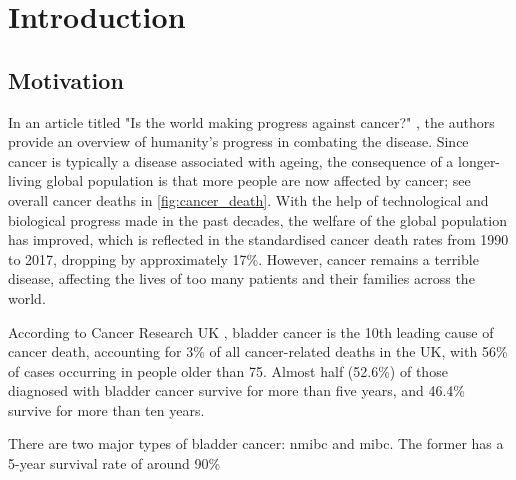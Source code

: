 
\chapter{Introduction}

\vspace{3mm}
\vspace{3mm}


\section{Motivation}

In an article titled "Is the world making progress against cancer?" \citep{Roser2015-qb}, the authors provide an overview of humanity's progress in combating the disease. Since cancer is typically a disease associated with ageing, the consequence of a longer-living global population is that more people are now affected by cancer; see overall cancer deaths in \cref{fig:cancer_death}. With the help of technological and biological progress made in the past decades, the welfare of the global population has improved, which is reflected in the standardised cancer death rates from 1990 to 2017, dropping by approximately 17\%. However, cancer remains a terrible disease, affecting the lives of too many patients and their families across the world.

According to Cancer Research UK \citep{Cancer_Research_UK2015-cf}, bladder cancer is the 10th leading cause of cancer death, accounting for 3\% of all cancer-related deaths in the UK, with 56\% of cases occurring in people older than 75. Almost half (52.6\%) of those diagnosed with bladder cancer survive for more than five years, and 46.4\% survive for more than ten years.

There are two major types of bladder cancer: \acrfull{nmibc} and \acrfull{mibc}. The former has a 5-year survival rate of around 90\% %

